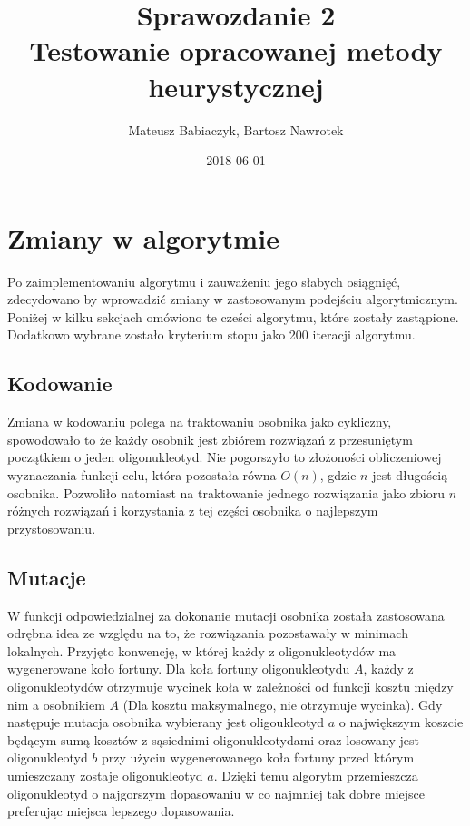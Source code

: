 \documentclass{article}
\title{Sprawozdanie 2 \\ Testowanie opracowanej metody heurystycznej}
\date{2018-06-01}
\author{Mateusz Babiaczyk, Bartosz Nawrotek}
\begin{document}
\maketitle
\section{Zmiany w algorytmie}  
Po zaimplementowaniu algorytmu i zauważeniu jego słabych osiągnięć, zdecydowano by wprowadzić zmiany w zastosowanym podejściu algorytmicznym. Poniżej w kilku sekcjach omówiono te cześci algorytmu, które zostały zastąpione. Dodatkowo wybrane zostało kryterium stopu jako 200 iteracji algorytmu.
\subsection{Kodowanie}
Zmiana w kodowaniu polega na traktowaniu osobnika jako cykliczny, spowodowało to że każdy osobnik jest zbiórem rozwiązań z przesuniętym początkiem o jeden oligonukleotyd. Nie pogorszyło to złożoności obliczeniowej wyznaczania funkcji celu, która pozostała równa $O(n)$, gdzie $n$ jest długością osobnika. Pozwoliło natomiast na traktowanie jednego rozwiązania jako zbioru $n$ różnych rozwiązań i korzystania z tej części osobnika o najlepszym przystosowaniu.
\subsection{Mutacje}
W funkcji odpowiedzialnej za dokonanie mutacji osobnika została zastosowana odrębna idea ze względu na to, że rozwiązania pozostawały w minimach lokalnych. Przyjęto konwencję, w której każdy z oligonukleotydów ma wygenerowane koło fortuny. Dla koła fortuny oligonukleotydu $A$, każdy z oligonukleotydów otrzymuje wycinek koła w zależności od funkcji kosztu między nim a osobnikiem $A$ (Dla kosztu maksymalnego, nie otrzymuje wycinka). Gdy następuje mutacja osobnika wybierany jest oligoukleotyd $a$ o największym koszcie będącym sumą kosztów z sąsiednimi oligonukleotydami oraz losowany jest oligonukleotyd $b$ przy użyciu wygenerowanego koła fortuny przed którym umieszczany zostaje oligonukleotyd $a$. Dzięki temu algorytm przemieszcza oligonukleotyd o najgorszym dopasowaniu w co najmniej tak dobre miejsce preferując miejsca lepszego dopasowania.
\end{document}
